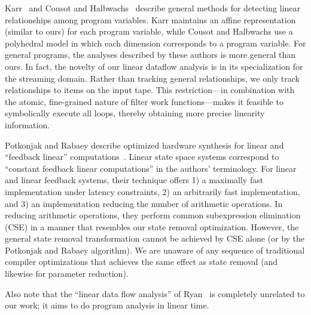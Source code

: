 Karr~\cite{karr76} and Cousot and Halbwachs~\cite{cousot78} describe
general methods for detecting linear relationships among program
variables.  Karr maintains an affine representation (similar to ours)
for each program variable, while Cousot and Halbwachs use a polyhedral
model in which each dimension corresponds to a program variable.  For
general programs, the analyses described by these authors is more
general than ours.  In fact, the novelty of our linear dataflow
analysis is in its specialization for the streaming domain.  Rather
than tracking general relationships, we only track relationships to
items on the input tape.  This restriction---in combination with the
atomic, fine-grained nature of filter work functions---makes it
feasible to symbolically execute all loops, thereby obtaining more
precise linearity information.

Potkonjak and Rabaey describe optimized hardware synthesis for linear
and ``feedback linear'' computations~\cite{Potkonjak00}.  Linear state
space systems correspond to ``constant feedback linear computations''
in the authors' terminology.  For linear and linear feedback systems,
their technique offers 1) a maximally fast implementation under
latency constraints, 2) an arbitrarily fast implementation, and 3) an
implementation reducing the number of arithmetic operations.  In
reducing arithmetic operations, they perform common subexpression
elimination (CSE) in a manner that resembles our state removal
optimization.  However, the general state removal transformation
cannot be achieved by CSE alone (or by the Potkonjak and Rabaey
algorithm).  We are unaware of any sequence of traditional compiler
optimizations that achieves the same effect as state removal (and
likewise for parameter reduction).

Also note that the ``linear data flow analysis'' of Ryan~\cite{ryan92}
is completely unrelated to our work; it aims to do program analysis in
linear time.

